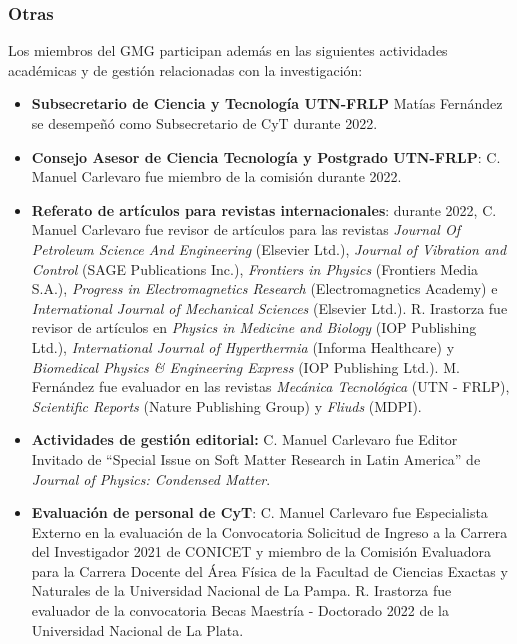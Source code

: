\documentclass[a4paper,11pt,twoside,final,titlepage,onecolumn,openright]{report}
\begin{document}
\subsubsection{Otras}

Los miembros del GMG participan además en las siguientes actividades académicas y de gestión relacionadas con la investigación:

\begin{itemize}
    \item \textbf{Subsecretario de Ciencia y Tecnología UTN-FRLP} Matías Fernández se desempeñó como Subsecretario de CyT durante 2022.

  \item \textbf{Consejo Asesor de Ciencia Tecnología y Postgrado UTN-FRLP}: C. Manuel Carlevaro fue miembro de la comisión durante 2022. 
  
  \item \textbf{Referato de artículos para revistas internacionales}: durante 2022, C. Manuel Carlevaro fue revisor de artículos para las revistas \textit{Journal Of Petroleum Science And Engineering} (Elsevier Ltd.), \textit{Journal of Vibration and Control} (SAGE Publications Inc.), \textit{Frontiers in Physics} (Frontiers Media S.A.), \textit{Progress in Electromagnetics Research} (Electromagnetics Academy) e \textit{International Journal of Mechanical Sciences} (Elsevier Ltd.). R. Irastorza fue revisor de artículos en \textit{Physics in Medicine and Biology} (IOP Publishing Ltd.), \textit{International Journal of Hyperthermia} (Informa Healthcare) y \textit{Biomedical Physics \& Engineering Express} (IOP Publishing Ltd.). M. Fernández fue evaluador en las revistas \textit{Mecánica Tecnológica} (UTN - FRLP), \textit{Scientific Reports} (Nature Publishing Group) y \textit{Fliuds} (MDPI).
 
 \item \textbf{Actividades de gestión editorial:} C. Manuel Carlevaro fue Editor Invitado de ``Special Issue on Soft Matter Research in Latin America'' de \textit{Journal of Physics: Condensed Matter}.
 
     \item \textbf{Evaluación de personal de CyT}: C. Manuel Carlevaro fue Especialista Externo en la evaluación de la Convocatoria Solicitud de Ingreso a la Carrera del Investigador 2021 de CONICET y miembro de la Comisión Evaluadora para la Carrera Docente del Área Física de la Facultad de Ciencias Exactas y Naturales de la Universidad Nacional de La Pampa. R. Irastorza fue evaluador de la convocatoria Becas Maestría - Doctorado 2022 de la Universidad Nacional de La Plata.


\end{itemize}
\end{document}
